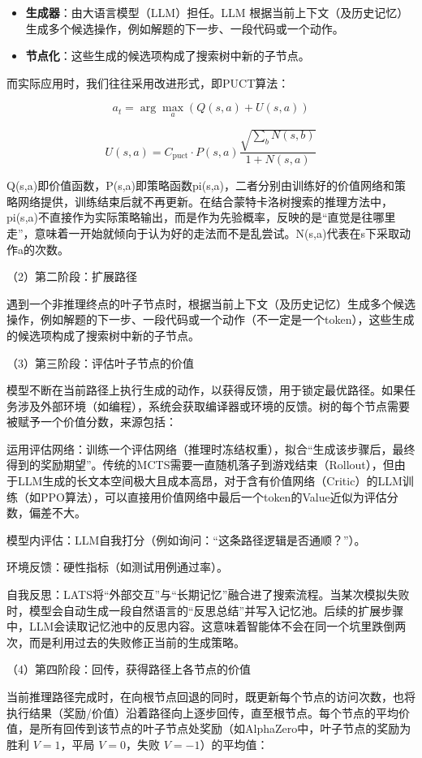 \begin{itemize}
\tightlist
\item
  \textbf{生成器}：由大语言模型（LLM）担任。LLM 根据当前上下文（及历史记忆）生成多个候选操作，例如解题的下一步、一段代码或一个动作。
\item
  \textbf{节点化}：这些生成的候选项构成了搜索树中新的子节点。
\end{itemize}

而实际应用时，我们往往采用改进形式，即PUCT算法：

\[
a_t=\arg\max_a\left(Q(s,a)+U(s,a)\right)
\]

\[
U(s,a)=C_{\mathrm{puct}}\cdot P(s,a)
\frac{\sqrt{\sum_b N(s,b)}}{1+N(s,a)}
\]

Q(s,a)即价值函数，P(s,a)即策略函数pi(s,a)，二者分别由训练好的价值网络和策略网络提供，训练结束后就不再更新。在结合蒙特卡洛树搜索的推理方法中，pi(s,a)不直接作为实际策略输出，而是作为先验概率，反映的是``直觉是往哪里走''，意味着一开始就倾向于认为好的走法而不是乱尝试。N(s,a)代表在s下采取动作a的次数。

（2）第二阶段：扩展路径

遇到一个非推理终点的叶子节点时，根据当前上下文（及历史记忆）生成多个候选操作，例如解题的下一步、一段代码或一个动作（不一定是一个token），这些生成的候选项构成了搜索树中新的子节点。

（3）第三阶段：评估叶子节点的价值

模型不断在当前路径上执行生成的动作，以获得反馈，用于锁定最优路径。如果任务涉及外部环境（如编程），系统会获取编译器或环境的反馈。树的每个节点需要被赋予一个价值分数，来源包括：

运用评估网络：训练一个评估网络（推理时冻结权重），拟合``生成该步骤后，最终得到的奖励期望''。传统的MCTS需要一直随机落子到游戏结束（Rollout），但由于LLM生成的长文本空间极大且成本高昂，对于含有价值网络（Critic）的LLM训练（如PPO算法），可以直接用价值网络中最后一个token的Value近似为评估分数，偏差不大。

模型内评估：LLM自我打分（例如询问：``这条路径逻辑是否通顺？''）。

环境反馈：硬性指标（如测试用例通过率）。

自我反思：LATS将``外部交互''与``长期记忆''融合进了搜索流程。当某次模拟失败时，模型会自动生成一段自然语言的``反思总结''并写入记忆池。后续的扩展步骤中，LLM会读取记忆池中的反思内容。这意味着智能体不会在同一个坑里跌倒两次，而是利用过去的失败修正当前的生成策略。

（4）第四阶段：回传，获得路径上各节点的价值

当前推理路径完成时，在向根节点回退的同时，既更新每个节点的访问次数，也将执行结果（奖励/价值）沿着路径向上逐步回传，直至根节点。每个节点的平均价值，是所有回传到该节点的叶子节点处奖励（如AlphaZero中，叶子节点的奖励为胜利 \(V=1\)，平局 \(V=0\)，失败 \(V=-1\)）的平均值：

